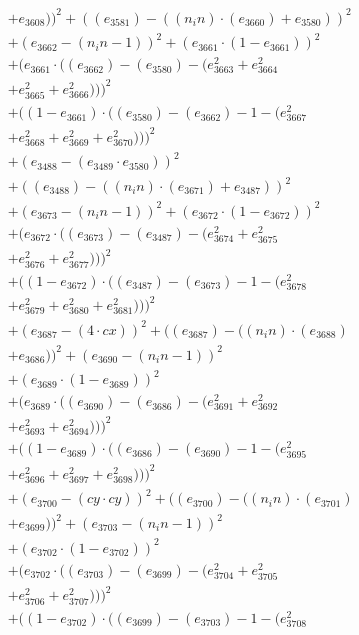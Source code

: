 \documentclass[10pt, a4paper]{article}
\begin{document}
\begin{small}
\begin{align*}
& + e_{3608}))^{2} + ((e_{3581}) - ((n_in)  \cdot  (e_{3660}) + e_{3580}))^{2} \\
& + (e_{3662} - (n_in - 1))^{2} + (e_{3661}  \cdot  (1 - e_{3661}))^{2} \\
& + (e_{3661}  \cdot  ((e_{3662}) - (e_{3580}) - (e_{3663}^{2} + e_{3664}^{2} \\
& + e_{3665}^{2} + e_{3666}^{2})))^{2} \\
& + ((1 - e_{3661})  \cdot  ((e_{3580}) - (e_{3662}) - 1 - (e_{3667}^{2} \\
& + e_{3668}^{2} + e_{3669}^{2} + e_{3670}^{2})))^{2} \\
& + (e_{3488} - (e_{3489}  \cdot  e_{3580}))^{2} \\
& + ((e_{3488}) - ((n_in)  \cdot  (e_{3671}) + e_{3487}))^{2} \\
& + (e_{3673} - (n_in - 1))^{2} + (e_{3672}  \cdot  (1 - e_{3672}))^{2} \\
& + (e_{3672}  \cdot  ((e_{3673}) - (e_{3487}) - (e_{3674}^{2} + e_{3675}^{2} \\
& + e_{3676}^{2} + e_{3677}^{2})))^{2} \\
& + ((1 - e_{3672})  \cdot  ((e_{3487}) - (e_{3673}) - 1 - (e_{3678}^{2} \\
& + e_{3679}^{2} + e_{3680}^{2} + e_{3681}^{2})))^{2} \\
& + (e_{3687} - (4  \cdot  cx))^{2} + ((e_{3687}) - ((n_in)  \cdot  (e_{3688}) \\
& + e_{3686}))^{2} + (e_{3690} - (n_in - 1))^{2} \\
& + (e_{3689}  \cdot  (1 - e_{3689}))^{2} \\
& + (e_{3689}  \cdot  ((e_{3690}) - (e_{3686}) - (e_{3691}^{2} + e_{3692}^{2} \\
& + e_{3693}^{2} + e_{3694}^{2})))^{2} \\
& + ((1 - e_{3689})  \cdot  ((e_{3686}) - (e_{3690}) - 1 - (e_{3695}^{2} \\
& + e_{3696}^{2} + e_{3697}^{2} + e_{3698}^{2})))^{2} \\
& + (e_{3700} - (cy  \cdot  cy))^{2} + ((e_{3700}) - ((n_in)  \cdot  (e_{3701}) \\
& + e_{3699}))^{2} + (e_{3703} - (n_in - 1))^{2} \\
& + (e_{3702}  \cdot  (1 - e_{3702}))^{2} \\
& + (e_{3702}  \cdot  ((e_{3703}) - (e_{3699}) - (e_{3704}^{2} + e_{3705}^{2} \\
& + e_{3706}^{2} + e_{3707}^{2})))^{2} \\
& + ((1 - e_{3702})  \cdot  ((e_{3699}) - (e_{3703}) - 1 - (e_{3708}^{2} \\

\end{align*}
\end{small}
\end{document}
